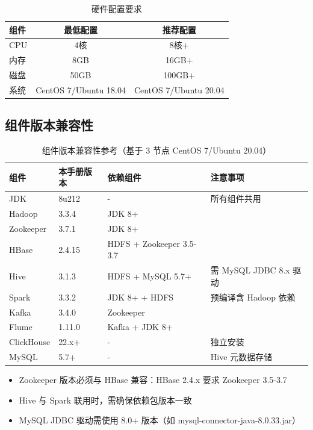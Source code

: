 \documentclass[12pt,a4paper]{article}
\begin{document}
\begin{table}[H]
\centering
\caption{硬件配置要求}
\begin{tabular}{lcc}
\toprule
\textbf{组件} & \textbf{最低配置} & \textbf{推荐配置} \\
\midrule
CPU & 4核 & 8核+ \\
内存 & 8GB & 16GB+ \\
磁盘 & 50GB & 100GB+ \\
系统 & CentOS 7/Ubuntu 18.04 & CentOS 7/Ubuntu 20.04 \\
\bottomrule
\end{tabular}
\end{table}

\subsection{组件版本兼容性}

\begin{table}[H]
\centering
\caption{组件版本兼容性参考（基于 3 节点 CentOS 7/Ubuntu 20.04）}
\begin{tabular}{llll}
\toprule
\textbf{组件} & \textbf{本手册版本} & \textbf{依赖组件} & \textbf{注意事项} \\
\midrule
JDK & 8u212 & - & 所有组件共用 \\
Hadoop & 3.3.4 & JDK 8+ & \\
Zookeeper & 3.7.1 & JDK 8+ & \\
HBase & 2.4.15 & HDFS + Zookeeper 3.5-3.7 & \\
Hive & 3.1.3 & HDFS + MySQL 5.7+ & 需 MySQL JDBC 8.x 驱动 \\
Spark & 3.3.2 & JDK 8+ + HDFS & 预编译含 Hadoop 依赖 \\
Kafka & 3.4.0 & Zookeeper & \\
Flume & 1.11.0 & Kafka + JDK 8+ & \\
ClickHouse & 22.x+ & - & 独立安装 \\
MySQL & 5.7+ & - & Hive 元数据存储 \\
\bottomrule
\end{tabular}
\end{table}

\begin{warnbox}[重要]
\begin{itemize}
    \item Zookeeper 版本必须与 HBase 兼容：HBase 2.4.x 要求 Zookeeper 3.5-3.7
    \item Hive 与 Spark 联用时，需确保依赖包版本一致
    \item MySQL JDBC 驱动需使用 8.0+ 版本（如 mysql-connector-java-8.0.33.jar）
\end{itemize}
\end{warnbox}
\end{document}
